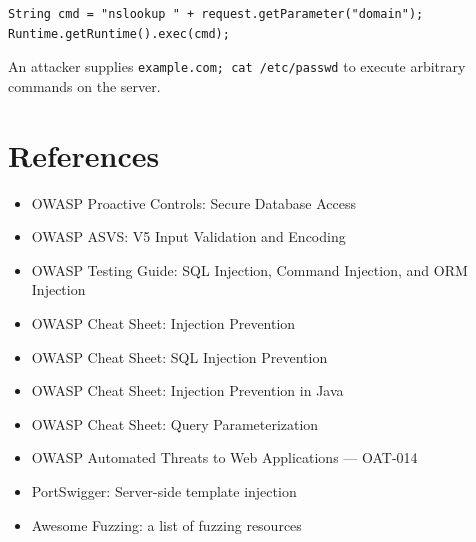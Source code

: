\documentclass[11pt]{article}
\begin{document}
\begin{codebox}
\begin{verbatim}
String cmd = "nslookup " + request.getParameter("domain");
Runtime.getRuntime().exec(cmd);
\end{verbatim}
\end{codebox}

An attacker supplies \texttt{example.com; cat /etc/passwd} to execute arbitrary commands on the server.

\section{References}
\begin{itemize}
  \item OWASP Proactive Controls: Secure Database Access
  \item OWASP ASVS: V5 Input Validation and Encoding
  \item OWASP Testing Guide: SQL Injection, Command Injection, and ORM Injection
  \item OWASP Cheat Sheet: Injection Prevention
  \item OWASP Cheat Sheet: SQL Injection Prevention
  \item OWASP Cheat Sheet: Injection Prevention in Java
  \item OWASP Cheat Sheet: Query Parameterization
  \item OWASP Automated Threats to Web Applications --- OAT-014
  \item PortSwigger: Server-side template injection
  \item Awesome Fuzzing: a list of fuzzing resources
\end{itemize}

\newpage
\end{document}

